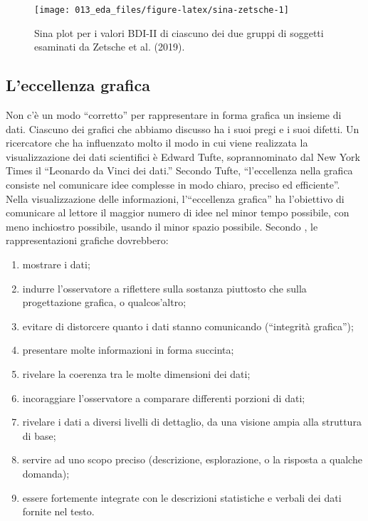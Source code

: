 \documentclass[
  10pt,
  italian,
  a4paper,
  extrafontsizes,onecolumn,openright
  ]{memoir}
\providecommand{\tightlist}{%
  \setlength{\itemsep}{0pt}\setlength{\parskip}{0pt}}
\theoremstyle{definition}
\theoremstyle{definition}
\theoremstyle{definition}
\theoremstyle{definition}
\theoremstyle{remark}
\begin{document}
\begin{figure}[h]

{\centering \texttt{[image: 013\_eda\_files/figure-latex/sina-zetsche-1]} 

}

\caption{Sina plot per i valori BDI-II di ciascuno dei due gruppi di soggetti esaminati da Zetsche et al. (2019).}\label{fig:sina-zetsche}
\end{figure}

\hypertarget{leccellenza-grafica}{%
\subsection{L'eccellenza grafica}\label{leccellenza-grafica}}

Non c'è un modo ``corretto'' per rappresentare in forma grafica un insieme
di dati. Ciascuno dei grafici che abbiamo discusso ha i suoi pregi e i
suoi difetti. Un ricercatore che ha influenzato molto il modo in cui
viene realizzata la visualizzazione dei dati scientifici è Edward Tufte,
soprannominato dal New York Times il ``Leonardo da Vinci dei dati.''
Secondo Tufte, ``l'eccellenza nella grafica consiste nel comunicare idee
complesse in modo chiaro, preciso ed efficiente''. Nella visualizzazione
delle informazioni, l'``eccellenza grafica'' ha l'obiettivo di comunicare
al lettore il maggior numero di idee nel minor tempo possibile, con meno
inchiostro possibile, usando il minor spazio possibile. Secondo
\textcite{tufte_visual_display}, le rappresentazioni grafiche dovrebbero:

\begin{enumerate}
\def\labelenumi{\arabic{enumi}.}
\tightlist
\item
  mostrare i dati;
\item
  indurre l'osservatore a riflettere sulla sostanza piuttosto che
  sulla progettazione grafica, o qualcos'altro;
\item
  evitare di distorcere quanto i dati stanno comunicando (``integrità
  grafica'');
\item
  presentare molte informazioni in forma succinta;
\item
  rivelare la coerenza tra le molte dimensioni dei dati;
\item
  incoraggiare l'osservatore a comparare differenti porzioni di dati;
\item
  rivelare i dati a diversi livelli di dettaglio, da una visione ampia
  alla struttura di base;
\item
  servire ad uno scopo preciso (descrizione, esplorazione, o la
  risposta a qualche domanda);
\item
  essere fortemente integrate con le descrizioni statistiche e verbali
  dei dati fornite nel testo.
\end{enumerate}
\end{document}
